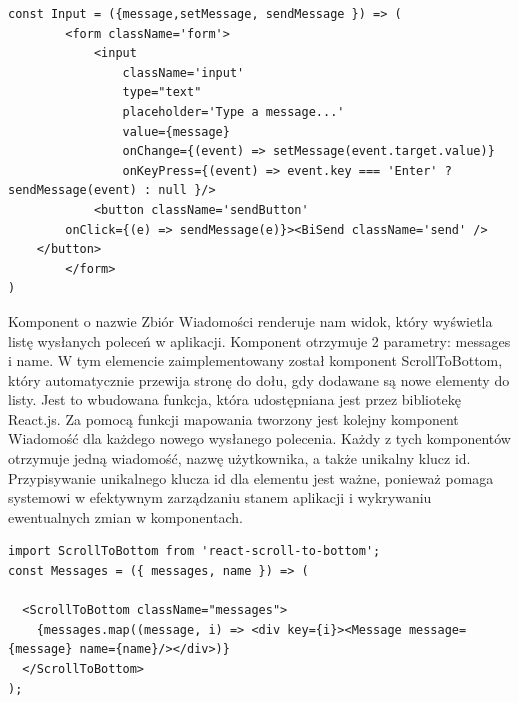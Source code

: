 \begin{lstlisting}[caption=Implementacja komponentu komunikacji ]
const Input = ({message,setMessage, sendMessage }) => (
        <form className='form'>
            <input 
                className='input'
                type="text"
                placeholder='Type a message...'
                value={message}
                onChange={(event) => setMessage(event.target.value)}
                onKeyPress={(event) => event.key === 'Enter' ? sendMessage(event) : null }/>
            <button className='sendButton' 
		onClick={(e) => sendMessage(e)}><BiSend className='send' />
	</button>
        </form>
)
\end{lstlisting}

Komponent o nazwie Zbiór Wiadomości renderuje nam widok, który wyświetla listę wysłanych poleceń w aplikacji. Komponent otrzymuje 2 parametry: messages i name. W tym elemencie zaimplementowany został komponent ScrollToBottom, który automatycznie przewija stronę do dołu, gdy dodawane są nowe elementy do listy. Jest to wbudowana funkcja, która udostępniana jest przez bibliotekę React.js. Za pomocą funkcji mapowania tworzony jest kolejny komponent Wiadomość dla każdego nowego wysłanego polecenia. Każdy z tych komponentów otrzymuje jedną wiadomość, nazwę użytkownika, a także unikalny klucz id. Przypisywanie unikalnego klucza id dla elementu jest ważne, ponieważ pomaga systemowi w efektywnym zarządzaniu stanem aplikacji i wykrywaniu ewentualnych zmian w komponentach.
\begin{lstlisting}[caption=Implementacja komponentu zbiór wiadomościi ]
import ScrollToBottom from 'react-scroll-to-bottom';
const Messages = ({ messages, name }) => (
  
  <ScrollToBottom className="messages">
    {messages.map((message, i) => <div key={i}><Message message={message} name={name}/></div>)}
  </ScrollToBottom>
);
\end{lstlisting}

